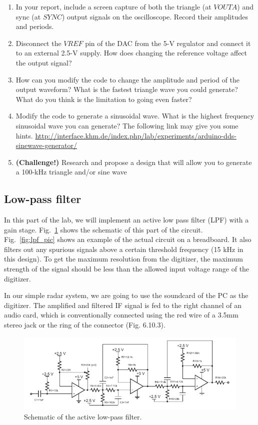 \documentclass[letterpaper, 11pt]{article}
\begin{document}
\begin{enumerate}
\item In your report, include a screen capture of both the triangle (at $VOUTA$) and sync (at $SYNC$) output signals on the oscilloscope. Record their amplitudes and periods.

\item Disconnect the $VREF$ pin of the DAC from the 5-V regulator and connect it to an external 2.5-V supply. How does changing the reference voltage affect the output signal?

\item How can you modify the code to change the amplitude and period of the output waveform? What is the fastest triangle wave you could generate? What do you think is the limitation to going even faster?

\item Modify the code to generate a sinusoidal wave. What is the highest frequency sinusoidal wave you can generate? The following link may give you some hints. 
\url{http://interface.khm.de/index.php/lab/experiments/arduino-dds-sinewave-generator/} 

\item \textbf{(Challenge!)} Research and propose a design that will allow you to generate a 100-kHz triangle and/or sine wave

\end{enumerate}

\subsection{Low-pass filter}

In this part of the lab, we will implement an active low pass filter (LPF) with a gain stage. Fig.~\ref{fig:lpf_sch} shows the schematic of this part of the circuit. Fig.~\ref{fig:lpf_pic} shows an example of the actual circuit on a breadboard. It also filters out any spurious signals above a certain threshold frequency (15 kHz in this design). To get the maximum resolution from the digitizer, the maximum strength of the signal should be less than the allowed input voltage range of the digitizer. 

In our simple radar system, we are going to use the soundcard of the PC as the digitizer. The amplified and filtered IF signal is fed to the right channel of an audio card, which is conventionally connected using the red wire of a 3.5mm stereo jack or the ring of the connector (Fig. 6.10.3). 

\begin{figure}[h]
	\centering
	\includegraphics{lpf_sch}
	\caption{Schematic of the active low-pass filter.}
	\label{fig:lpf_sch}
\end{figure}
\end{document}
